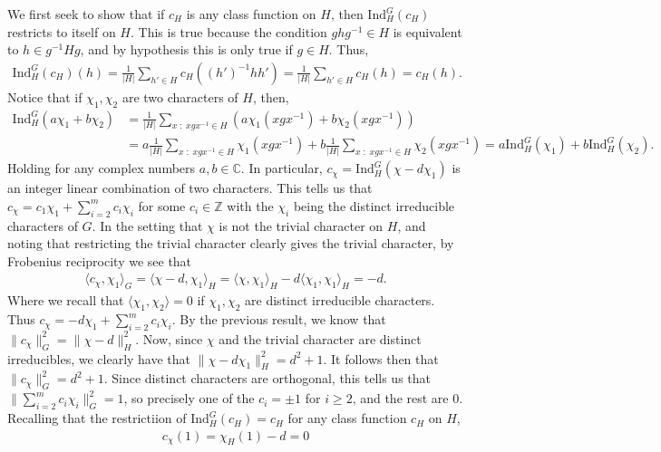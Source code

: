 \documentclass[12pt]{article}
\theoremstyle{definitionstyle}
\def\mbb#1{\mathbb{#1}}
\def\C{\mbb{C}}
\newcommand{\mg}[1]{\| #1 \|}
\renewcommand{\ip}[1]{\langle#1\rangle}
\newcommand{\Z}{\mbb Z}
\newcommand{\Ind}{\mathrm{Ind}}
\begin{document}
\begin{enumerate}
        We first seek to show that if $c_H$ is any class function on $H$, then $\Ind_H^G(c_H)$ restricts to itself on $H$. This is true because the condition $ghg^{-1} \in H$ is equivalent to $h \in g^{-1}Hg$, and by hypothesis this is only true if $g \in H$. Thus,
        \begin{align*}
            \Ind_H^G(c_H)(h) = \frac{1}{|H|} \sum_{h' \in H} c_H((h')^{-1}hh') = \frac{1}{|H|} \sum_{h' \in H} c_H(h) = c_H(h).
        \end{align*}
        Notice that if $\chi_1, \chi_2$ are two characters of $H$, then,
        \begin{align*}
            \Ind_H^G(a\chi_1 + b\chi_2) &= \frac{1}{|H|} \sum_{x \;:\; xgx^{-1} \in H} (a\chi_1(xgx^{-1}) + b\chi_2(xgx^{-1})) \\&= a\frac{1}{|H|} \sum_{x \;:\; xgx^{-1} \in H} \chi_1(xgx^{-1}) + b\frac{1}{|H|} \sum_{x \;:\; xgx^{-1} \in H} \chi_2(xgx^{-1}) = a\Ind_H^G(\chi_1) + b\Ind_H^G(\chi_2).
        \end{align*}
        Holding for any complex numbers $a, b \in \C$. In particular, $c_\chi = \Ind_H^G(\chi - d\chi_1)$ is an integer linear combination of two characters. This tells us that $c_\chi = c_1 \chi_1 + \sum_{i=2}^m c_i\chi_i$ for some $c_i \in \Z$ with the $\chi_i$ being the distinct irreducible characters of $G$. In the setting that $\chi$ is not the trivial character on $H$, and noting that restricting the trivial character clearly gives the trivial character, by Frobenius reciprocity we see that
        \begin{align*}
            \ip{c_\chi, \chi_1}_G = \ip{\chi - d, \chi_1}_H = \ip{\chi, \chi_1}_H - d\ip{\chi_1, \chi_1}_H = -d.
        \end{align*}
        Where we recall that $\ip{\chi_1, \chi_2} = 0$ if $\chi_1, \chi_2$ are distinct irreducible characters. Thus $c_\chi = -d\chi_1 + \sum_{i=2}^m c_i\chi_i$. By the previous result, we know that $\mg{c_\chi}_G^2 = \mg{\chi - d}_H^2$. Now, since $\chi$ and the trivial character are distinct irreducibles, we clearly have that $\mg{\chi - d\chi_1}_H^2 = d^2+1$. It follows then that $\mg{c_\chi}_G^2 = d^2+1$. Since distinct characters are orthogonal, this tells us that $\mg{\sum_{i=2}^m c_i\chi_i}_G^2 = 1$, so precisely one of the $c_i = \pm 1$ for $i \geq 2$, and the rest are 0. Recalling that the restrictiion of $\Ind_H^G(c_H) = c_H$ for any class function $c_H$ on $H$,
        \begin{align*}
            c_\chi(1) = \chi_H(1) - d = 0
        \end{align*}

\end{enumerate}
\end{document}
